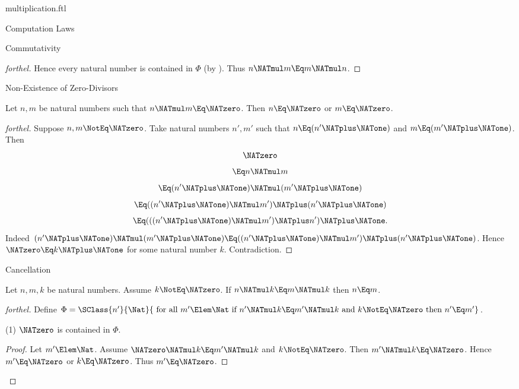 \documentclass{stex}
\begin{document}
\begin{smodule}{multiplication.ftl}
\begin{sfragment}{Computation Laws}
\begin{sfragment}{Commutativity}
\begin{proof}[forthel]
      Hence every natural number is contained in $\Phi$ (by ).
      Thus $n \NATmul m \Eq m \NATmul n$.
    \end{proof}
  \end{sfragment}

  \begin{sfragment}{Non-Existence of Zero-Divisors}
    \begin{proposition}[forthel,id=ARITHMETIC_06_3843962875936768]
      Let $n, m$ be natural numbers such that $n \NATmul m \Eq \NATzero$.
      Then $n \Eq \NATzero$ or $m \Eq \NATzero$.
    \end{proposition}
    \begin{proof}[forthel]
      Suppose $n, m \NotEq \NATzero$.
      Take natural numbers $n', m'$ such that $n \Eq (n' \NATplus \NATone)$ and $m \Eq (m' \NATplus \NATone)$.
      Then
      \[  \NATzero                                     \]
      \[    \Eq n \NATmul m                         \]
      \[    \Eq (n' \NATplus \NATone) \NATmul (m' \NATplus \NATone)           \]
      \[    \Eq ((n' \NATplus \NATone) \NATmul m') \NATplus (n' \NATplus \NATone)    \]
      \[    \Eq (((n' \NATplus \NATone) \NATmul m') \NATplus n') \NATplus \NATone.   \]
      Indeed $(n' \NATplus \NATone) \NATmul (m' \NATplus \NATone) \Eq ((n' \NATplus \NATone) \NATmul m') \NATplus (n' \NATplus \NATone)$.
      Hence $\NATzero \Eq k \NATplus \NATone$ for some natural number $k$.
      Contradiction.
    \end{proof}
  \end{sfragment}

  \begin{sfragment}{Cancellation}
    \begin{proposition}[forthel,id=ARITHMETIC_06_31055184658432]
      Let $n, m, k$ be natural numbers.
      Assume $k \NotEq \NATzero$.
      If $n \NATmul k \Eq m \NATmul k$ then $n \Eq m$.
    \end{proposition}
    \begin{proof}[forthel]
      Define $\Phi = \SClass{n'}{\Nat}{\text{ for all }m' \Elem \Nat\text{ if }n' \NATmul k \Eq m' \NATmul k\text{ and }k \NotEq \NATzero\text{ then }n' \Eq m'}$.

      (1) $\NATzero$ is contained in $\Phi$.
      \begin{proof}
        Let $m' \Elem \Nat$.
        Assume $\NATzero \NATmul k \Eq m' \NATmul k$ and $k \NotEq \NATzero$.
        Then $m' \NATmul k \Eq \NATzero$.
        Hence $m' \Eq \NATzero$ or $k \Eq \NATzero$.
        Thus $m' \Eq \NATzero$.
      \end{proof}


\end{proof}
\end{sfragment}
\end{sfragment}
\end{smodule}
\end{document}
